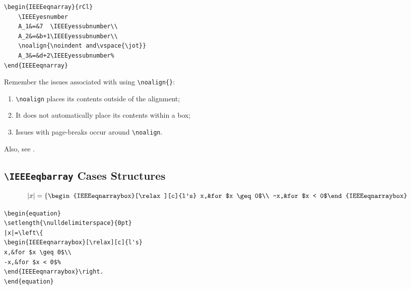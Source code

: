 \documentclass[journal]{IEEEtran}
\begin{document}
\begin{verbatim}
\begin{IEEEeqnarray}{rCl}
	\IEEEyesnumber
	A_1&=&7  \IEEEyessubnumber\\
	A_2&=&b+1\IEEEyessubnumber\\
	\noalign{\noindent and\vspace{\jot}}
	A_3&=&d+2\IEEEyessubnumber%
\end{IEEEeqnarray}
\end{verbatim}

Remember the issues associated with using \verb!\noalign{}!:
\begin{enumerate}
\item \verb!\noalign! places its contents outside of the alignment;
\item It does not automatically place its contents within a box;
\item Issues with page-breaks occur around \verb!\noalign!.
\end{enumerate}

Also, see .


\par \noindent \dotfill
\subsection{\texttt{\textbackslash IEEEeqbarray} Cases Structures}
\begin{equation}
\setlength{\nulldelimiterspace}{0pt}
|x|=\left\{
\begin{IEEEeqnarraybox}[\relax][c]{l's}
 x,&for $x \geq 0$\\
-x,&for $x < 0$%
\end{IEEEeqnarraybox}\right.
\end{equation}


\begin{verbatim}
\begin{equation}
\setlength{\nulldelimiterspace}{0pt}
|x|=\left\{
\begin{IEEEeqnarraybox}[\relax][c]{l's}
x,&for $x \geq 0$\\
-x,&for $x < 0$%
\end{IEEEeqnarraybox}\right.
\end{equation}
\end{verbatim}

\par \noindent \dotfill
\end{document}
